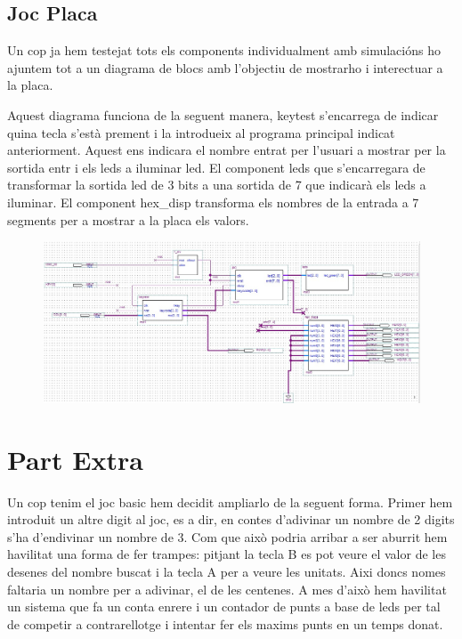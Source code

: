 \documentclass[12pt, a4papre]{article}
\begin{document}
		
	\subsection{Joc Placa}
	
	Un cop ja hem testejat tots els components individualment amb simulacións ho ajuntem tot a un diagrama de blocs amb l'objectiu de mostrarho i interectuar a la placa. 
	
	Aquest diagrama funciona de la seguent manera, keytest s'encarrega de indicar quina tecla s'està prement i la introdueix al programa principal indicat anteriorment. Aquest ens indicara el nombre entrat per l'usuari a mostrar per la sortida entr i els leds a iluminar led. El component leds que s'encarregara de transformar la sortida led de 3 bits a una sortida de 7 que indicarà els leds a iluminar. El component hex\_disp transforma els nombres de la entrada a 7 segments per a mostrar a la placa els valors.
	
	\begin{figure}[H]
		\begin{center}
		\includegraphics[width=130mm]{jocPlaca.jpeg}
		\end{center}
	\end{figure}	

\newpage

\section{Part Extra}

Un cop tenim el joc basic hem decidit ampliarlo de la seguent forma. Primer hem introduit un altre digit al joc, es a dir, en contes d'adivinar un nombre de 2 digits s'ha d'endivinar un nombre de 3. Com que això podria arribar a ser aburrit hem havilitat una forma de fer trampes: pitjant la tecla B es pot veure el valor de les desenes del nombre buscat i la tecla A per a veure les unitats. Aixi doncs nomes faltaria un  nombre per a adivinar, el de les centenes. 
A mes d'això hem havilitat un sistema que fa un conta enrere i un contador de punts a base de leds per tal de competir a contrarellotge i intentar fer els maxims punts en un temps donat.
\end{document}
